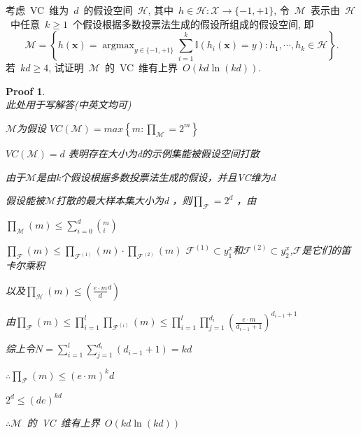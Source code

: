 \documentclass[a4paper,UTF8]{article}
\numberwithin{equation}{section}
\newtheorem*{myProof}{Proof}
\begin{document}
\noindent 考虑~VC~维为~$d$~的假设空间~$\mathcal{H}$, 其中~$h \in \mathcal{H} : \mathcal{X} \rightarrow \{ -1 , +1 \} $, 令~$\mathcal{M}$~表示由~$\mathcal{H}$~中任意~$k \geqslant 1$~个假设根据多数投票法生成的假设所组成的假设空间, 即
\begin{equation}
    \mathcal{M} 
    = \left\{ h(\bm{x}) = \mathop{\arg \max}_{ y \in \{ -1 , +1 \} } \sum_{i=1}^k \mathbb{I} ( h_i(\bm{x}) = y) : h_1 , \cdots , h_k \in \mathcal{H} \right\} . 
\end{equation}
若~$kd \geqslant 4$, 试证明~$\mathcal{M}$~的~VC~维有上界~$ O ( kd \ln(kd) )$. 

\begin{myProof}~\\ 
    此处用于写解答(中英文均可)
    
    
    $\mathcal{M}$为假设
    $VC\left ( \mathcal{M}  \right ) = max\left\{ m: \prod _\mathcal{M} = 2^m\right\}$
    
    $VC\left ( \mathcal{M}  \right ) = d$ 表明存在大小为d的示例集能被假设空间打散
    
    由于$\mathcal{M} $是由k个假设根据多数投票法生成的假设，并且VC维为d
    
    假设能被$\mathcal{M} $打散的最大样本集大小为d ，则$\prod_{\mathcal{F}} = 2^d$ ，由
    
    $\prod_{\mathcal{M}}\left ( m \right )\leq \sum_{i=0}^{d}\left ( _{i}^{m}\textrm{} \right )$
    
    $\prod_{\mathcal{F}}\left ( m \right ) \leq \prod_{\mathcal{F}^{\left ( 1 \right )}}\left ( m \right )\cdot \prod_{\mathcal{F}^{\left ( 2 \right )}}\left ( m \right )$ 
    $\mathcal{F}^{\left ( 1 \right )}\subset y_{1}^{x}$和$\mathcal{F}^{\left ( 2 \right )}\subset y_{2}^{x}$,$\mathcal{F}$是它们的笛卡尔乘积
    
    以及$\prod_{\mathcal{H}}\left ( m \right )\leq \left ( {\frac{e\cdot m}{d}}^d \right )$
    
    由$\prod_{\mathcal{F}}\left ( m \right )\leq \prod_{i=1}^{l}\prod_{\mathcal{F}^{\left ( i \right )}}\left ( m \right )\leq \prod_{i=1}^{l}\prod_{j=1}^{d_i}\left ( \frac{e\cdot m}{d_{i-1}+1} \right )^{d_{i-1}+1}$
    
    综上令$N=\sum_{i=1}^{l}\sum_{j=1}^{d_i}\left ( d_{i-1}+1 \right ) = kd $
    
    $\therefore \prod_{\mathcal{F}}\left ( m \right )\leq \left ( e\cdot m \right )^kd$
    
    $2^d\leq \left ( de \right )^{kd}$
    
    $\therefore \mathcal{M}$~的~VC~维有上界~$ O ( kd \ln(kd) )$
    
    
    
    
    
\end{myProof}
\end{document}
